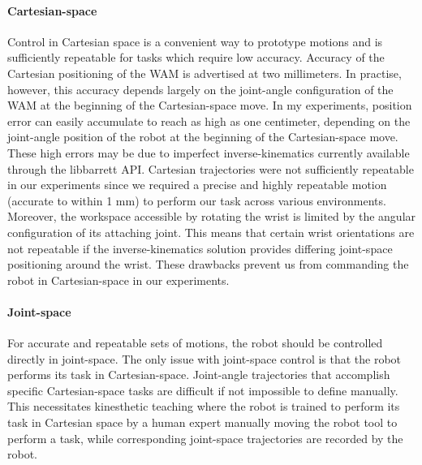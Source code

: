 \paragraph{Cartesian-space}
Control in Cartesian space is a convenient way to prototype motions and is sufficiently repeatable for tasks which require low accuracy.
Accuracy of the Cartesian positioning of the WAM is advertised at two millimeters.
In practise, however, this accuracy depends largely on the joint-angle configuration of the WAM at the beginning of the Cartesian-space move.
In my experiments, position error can easily accumulate to reach as high as one centimeter, depending on the joint-angle position of the robot at the beginning of the Cartesian-space move.
These high errors may be due to imperfect inverse-kinematics currently available through the libbarrett API.
Cartesian trajectories were not sufficiently repeatable in our experiments since we required a precise and highly repeatable motion (accurate to within 1 mm) to perform our task across various environments.
Moreover, the workspace accessible by rotating the wrist is limited by the angular configuration of its attaching joint. 
This means that certain wrist orientations are not repeatable if the inverse-kinematics solution provides differing joint-space positioning around the wrist.
These drawbacks prevent us from commanding the robot in Cartesian-space in our experiments.

\paragraph{Joint-space}
For accurate and repeatable sets of motions, the robot should be controlled directly in joint-space.
The only issue with joint-space control is that the robot performs its task in Cartesian-space. 
Joint-angle trajectories that accomplish specific Cartesian-space tasks are difficult if not impossible to define manually.
This necessitates kinesthetic teaching where the robot is trained to perform its task in Cartesian space by a human expert manually moving the robot tool to perform a task, while corresponding joint-space trajectories are recorded by the robot.

